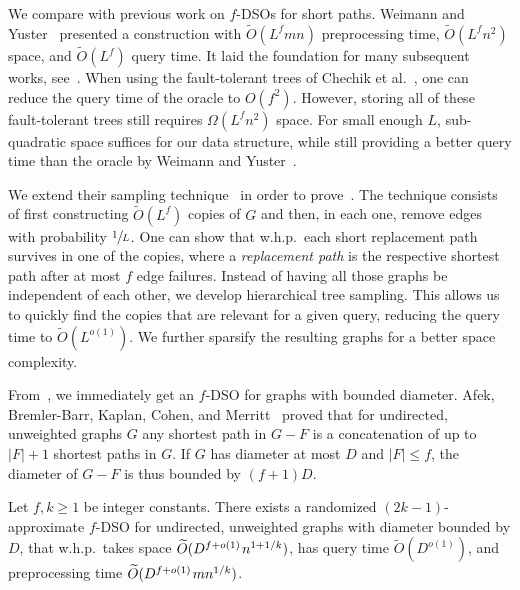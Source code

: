 \documentclass{article}\usepackage[a4paper,margin=20mm]{geometry}
\newcommand*{\Otilde}{\widetilde{O}}
\newcommand*{\nwspace}{\hspace*{.1em}}
\renewcommand{\le}{\leqslant}
\renewcommand{\ge}{\geqslant}
\begin{document}
We compare  with previous work on $f$-DSOs for short paths.
Weimann and Yuster~\cite{WY13} presented a construction with $\Otilde(L^f mn)$ preprocessing time, 
$\Otilde(L^f n^2)$ space, and $\Otilde(L^f)$ query time. 
It laid the foundation for many subsequent works, see~\cite{AlonChechikCohen19CombinatorialRP,BCFS21DiameterOracle_MFCS,Bilo22Extremal,
KarthikParter21DeterministicRPC,Ren22Improved}.
When using the fault-tolerant trees of Chechik et al.~\cite{ChCoFiKa17}, 
one can reduce the query time of the oracle to $O(f^2)$.
However, storing all of these fault-tolerant trees still requires $\Omega(L^f n^2)$ space.
For small enough $L$, sub-quadratic space suffices for our data structure,
while still providing a better query time than the oracle by Weimann and Yuster~\cite{WY13}. 

We extend their sampling technique~\cite{WY13}
in order to prove~.
The technique consists of first constructing $\Otilde(L^f)$ copies of $G$ and then, in each one,
remove edges with probability $\sfrac{1}{L}$.
One can show that w.h.p.\ each short replacement path survives in one of the copies,
where a \emph{replacement path} is the respective shortest path after at most $f$ edge failures.
Instead of having all those graphs be independent of each other, 
we develop hierarchical tree sampling.
This allows us to quickly find
the copies that are relevant for a given query, 
reducing the query time to $\Otilde(L^{o(1)})$.
We further sparsify the resulting graphs for a better space complexity.

From~, we immediately get an $f$-DSO for graphs with bounded diameter. Afek, Bremler-Barr, Kaplan, Cohen, and Merritt~\cite{Afek02RestorationbyPathConcatenation_journal}
proved that for undirected, unweighted graphs $G$ any shortest path in $G-F$
is a concatenation of up to $|F|+1$ shortest paths in $G$.
If $G$ has diameter at most $D$ and $|F| \le f$, the diameter of $G-F$ is thus bounded by $(f{+}1)D$.

\begin{corollary}
\label{cor:oracle_bounded_diameter}
  Let $f,k \ge 1$ be integer constants.
  There exists a randomized $(2k{-}1)$-approximate $f$-DSO for undirected, unweighted graphs
  with diameter bounded by $D$,
  that w.h.p.\ takes space $\Otilde(D^{f+o(1)} \nwspace n^{1+1/k})$, 
  has query time $\Otilde(D^{o(1)})$, and preprocessing time $\Otilde(D^{f+o(1)} \nwspace mn^{1/k})$.
\end{corollary}
\end{document}

